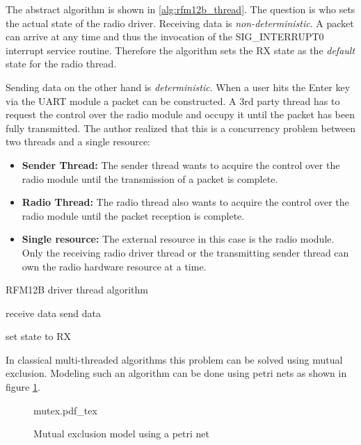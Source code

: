 The abstract algorithm is shown in \ref{alg:rfm12b_thread}. The question is who sets the actual state of the radio driver. Receiving data is \emph{non-deterministic}. A packet can arrive at any time and thus the invocation of the SIG\_INTERRUPT0 interrupt service routine. Therefore the algorithm sets the RX state as the \emph{default} state for the radio thread.

Sending data on the other hand is \emph{deterministic}. When a user hits the Enter key via the UART module a packet can be constructed. A 3rd party thread has to request the control over the radio module and occupy it until the packet has been fully transmitted. The author realized that this is a concurrency problem between two threads and a single resource:
\begin{itemize}
\item \textbf{Sender Thread:} The sender thread wants to acquire the control over the radio module until the transmission of a packet is complete.
\item \textbf{Radio Thread:} The radio thread also wants to acquire the control over the radio module until the packet reception is complete.
\item \textbf{Single resource:} The external resource in this case is the radio module. Only the receiving radio driver thread or the transmitting sender thread can own the radio hardware resource at a time.
\end{itemize}

\begin{algorithm}[H]
\caption{RFM12B driver thread algorithm}
\label{alg:rfm12b_thread}
\begin{algorithmic}
        \STATE receive data
        \STATE send data
    \ENDIF 

    \STATE set state to RX
\ENDWHILE
\end{algorithmic}
\end{algorithm}

In classical multi-threaded algorithms this problem can be solved using mutual exclusion. Modeling such an algorithm can be done using petri nets as shown in figure \ref{fig:petri_mutex}.

\begin{figure}[H]
\centering
{mutex.pdf_tex}
\caption{Mutual exclusion model using a petri net}
\label{fig:petri_mutex}
\end{figure}




